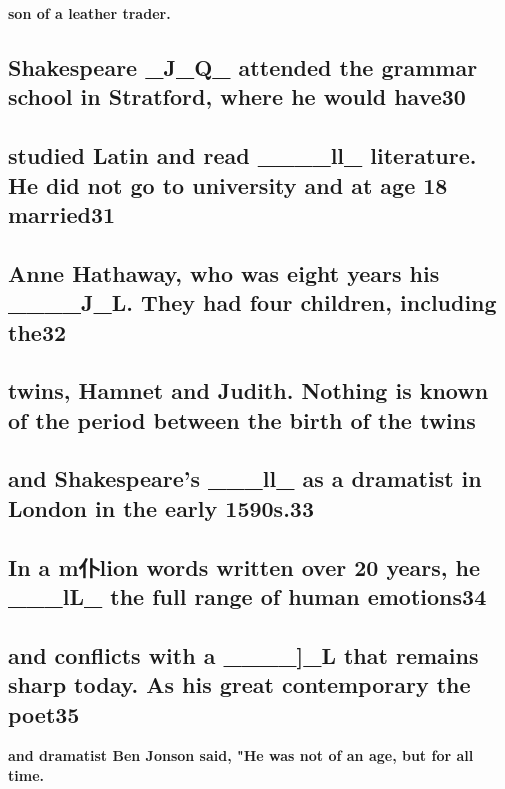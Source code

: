 \documentclass[UTF8,11pt]{ctexart}
\begin{document}
\textbf{son of a leather trader.}


\subsection*{\textbf{Shakespeare \_J\_Q\_ attended the grammar school in Stratford, where he would have}30}


\subsection*{\textbf{studied Latin and read \_\_\_\_ll\_ literature. He did not go to university and at age 18 married}31}


\subsection*{\textbf{Anne Hathaway, who was eight years his \_\_\_\_J\_L. They had four children, including the}32}


\subsection*{\textbf{twins, Hamnet and Judith. Nothing is known of the period between the birth of the twins}}


\subsection*{\textbf{and Shakespeare's \_\_\_ll\_ as a dramatist in London in the early 1590s.}33}


\subsection*{\textbf{In a m}仆\textbf{lion words written over 20 years, he \_\_\_lL\_ the full range of human emotions}34}


\subsection*{\textbf{and conflicts with a \_\_\_\_]\_L that remains sharp today. As his great contemporary the poet}35}


\textbf{and dramatist Ben Jonson said, "He was not of an age, but for all time.}
\end{document}

